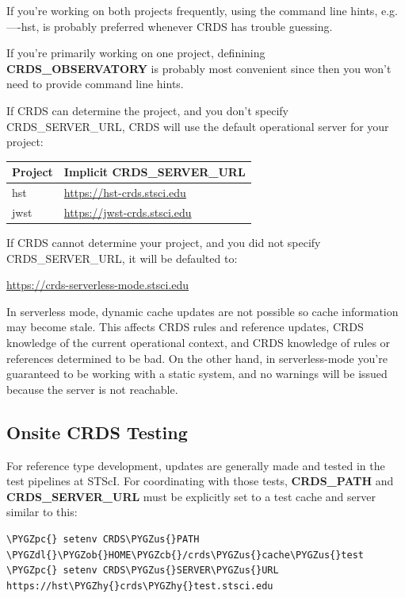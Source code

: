 \documentclass[letterpaper,10pt,english]{sphinxmanual}
\def\PYGZus{\char`\_}
\def\PYGZob{\char`\{}
\def\PYGZcb{\char`\}}
\def\PYGZpc{\char`\%}
\def\PYGZdl{\char`\$}
\def\PYGZhy{\char`\-}
\begin{document}
If you're working on both projects frequently,  using the command line hints,  e.g. ----hst,  is probably
preferred whenever CRDS has trouble guessing.

If you're primarily working on one project,  definining \textbf{CRDS\_OBSERVATORY} is probably most convenient
since then you won't need to provide command line hints.

If CRDS can determine the project,  and you don't specify CRDS\_SERVER\_URL,  CRDS will use the default
operational server for your project:

\begin{tabulary}{\linewidth}{|L|L|}
\hline
\textsf{\relax 
Project
} & \textsf{\relax 
Implicit CRDS\_SERVER\_URL
}\\
\hline
hst
 & 
\href{https://hst-crds.stsci.edu}{https://hst-crds.stsci.edu}
\\

jwst
 & 
\href{https://jwst-crds.stsci.edu}{https://jwst-crds.stsci.edu}
\\
\hline\end{tabulary}


If CRDS cannot determine your project,  and you did not specify CRDS\_SERVER\_URL,  it will be defaulted to:

\href{https://crds-serverless-mode.stsci.edu}{https://crds-serverless-mode.stsci.edu}

In serverless mode, dynamic cache updates are not possible so cache information may become stale.  This affects CRDS
rules and reference updates,  CRDS knowledge of the current operational context, and CRDS knowledge of rules or
references determined to be bad.   On the other hand,  in serverless-mode you're guaranteed to be working with
a static system, and no warnings will  be issued because the server is not reachable.


\subsection{Onsite CRDS Testing}
\label{installation:onsite-crds-testing}
For reference type development,  updates are generally made and tested in the test pipelines at STScI.  For
coordinating with those tests,  \textbf{CRDS\_PATH} and \textbf{CRDS\_SERVER\_URL} must be explicitly set to a test cache and server
similar to this:

\begin{Verbatim}[commandchars=\\\{\}]
\PYGZpc{} setenv CRDS\PYGZus{}PATH  \PYGZdl{}\PYGZob{}HOME\PYGZcb{}/crds\PYGZus{}cache\PYGZus{}test
\PYGZpc{} setenv CRDS\PYGZus{}SERVER\PYGZus{}URL https://hst\PYGZhy{}crds\PYGZhy{}test.stsci.edu
\end{Verbatim}
\end{document}
